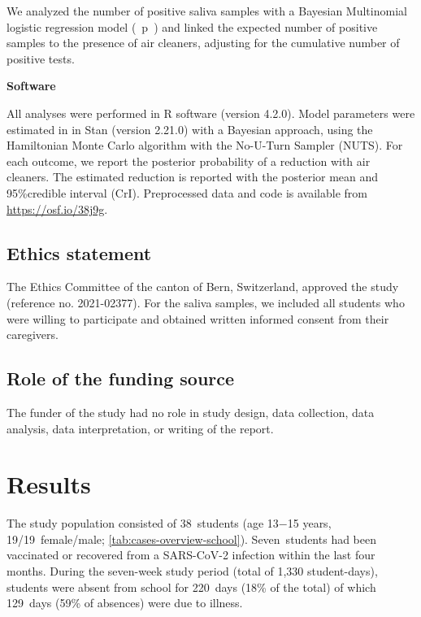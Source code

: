 \documentclass[fleqn,11pt]{wlscirep}
\begin{document}
\noindent We analyzed the number of positive saliva samples with a Bayesian Multinomial logistic regression model (\supp~p~) and linked the expected number of positive samples to the presence of air cleaners, adjusting for the cumulative number of positive tests. \medskip

\noindent\textbf{Software}\smallskip

\noindent All analyses were performed in R software (version 4.2.0). Model parameters were estimated in in Stan (version 2.21.0) with a Bayesian approach, using the Hamiltonian Monte Carlo algorithm with the No-U-Turn Sampler (NUTS).\cite{Hoffman2014} For each outcome, we report the posterior probability of a reduction with air cleaners. The estimated reduction is reported with the posterior mean and 95\%credible interval (CrI). Preprocessed data and code is available from \url{https://osf.io/38j9g}.


\subsection*{Ethics statement}

\noindent The Ethics Committee of the canton of Bern, Switzerland, approved the study (reference no. 2021-02377). For the saliva samples, we included all students who were willing to participate and obtained written informed consent from their caregivers.

\subsection*{Role of the funding source}

The funder of the study had no role in study design, data collection, data analysis, data interpretation, or writing of the report.


\newpage

\section*{Results}

The study population consisted of 38~students (age 13$-$15 years, 19/19~female/male; \cref{tab:cases-overview-school}). Seven~students had been vaccinated or recovered from a SARS-CoV-2 infection within the last four months. During the seven-week study period (total of 1,330 student-days), students were absent from school for 220~days (18\% of the total) of which 129~days (59\% of absences) were due to illness.  
\end{document}
